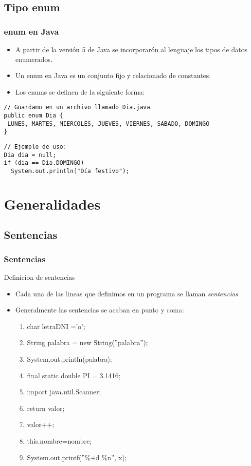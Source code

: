 \documentclass{beamer}
\begin{document}
\subsection{Tipo enum}
\begin{frame}[fragile]
\frametitle{enum en Java}
\begin{itemize}[<+-| alert@+>]
\item A partir de la versión 5 de Java se incorporarón al lenguaje los tipos de datos enumerados.
\item Un enum en Java es un conjunto fijo y relacionado de constantes.
\item Los enums se definen de la siguiente forma:
\end{itemize}
\pause
\begin{small}

\begin{verbatim}
// Guardamo en un archivo llamado Dia.java
public enum Dia {
 LUNES, MARTES, MIERCOLES, JUEVES, VIERNES, SABADO, DOMINGO
}
\end{verbatim}
\end{small}
\pause
\begin{verbatim}
// Ejemplo de uso:
Dia dia = null;
if (dia == Dia.DOMINGO)
  System.out.println("Día festivo");
\end{verbatim}
\pause
\end{frame}

\section{Generalidades }
\subsection{Sentencias} 

\begin{frame}
    \frametitle{Sentencias}
\begin{block}{Definicion de sentencias}
\begin{itemize}[<+-| alert@+>]
\item Cada una de las lineas que definimos en un programa se llaman \emph{sentencias}
\item Generalmente las sentencias se acaban en punto y coma:
\begin{enumerate}
\item char letraDNI ='o'; 
\item String palabra = new String(''palabra'');
\item System.out.println(palabra);
\item final static double PI = 3.1416;
\item import java.util.Scanner;
\item return valor;
\item valor++;
\item this.nombre=nombre;
\item System.out.printf(''\%+d \%n'', x);
\end{enumerate} 
\end{itemize}
\end{block}
\pause

\end{frame}
\end{document}
